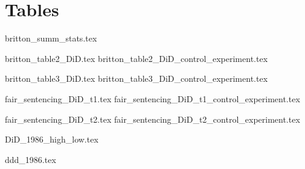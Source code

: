 \documentclass{article}
\begin{document}


\section*{Tables}
{britton_summ_stats.tex}

{britton_table2_DiD.tex}
{britton_table2_DiD_control_experiment.tex}

{britton_table3_DiD.tex}
{britton_table3_DiD_control_experiment.tex}

{fair_sentencing_DiD_t1.tex}
{fair_sentencing_DiD_t1_control_experiment.tex}

{fair_sentencing_DiD_t2.tex}
{fair_sentencing_DiD_t2_control_experiment.tex}

{DiD_1986_high_low.tex}

{ddd_1986.tex}



\clearpage
\nocite{*}
\singlespacing




\clearpage
\end{document}

